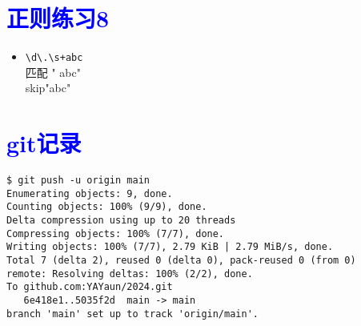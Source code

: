 \documentclass{article}
\begin{document}
\section{\textcolor{blue}{正则练习8}}
\begin{itemize}
\item \verb|\d\.\s+abc| \\ 匹配 " abc" \\skip"abc"
\end{itemize}
\section{\textcolor{blue}{git记录}}
\begin{lstlisting}
$ git push -u origin main
Enumerating objects: 9, done.
Counting objects: 100% (9/9), done.
Delta compression using up to 20 threads
Compressing objects: 100% (7/7), done.
Writing objects: 100% (7/7), 2.79 KiB | 2.79 MiB/s, done.
Total 7 (delta 2), reused 0 (delta 0), pack-reused 0 (from 0)
remote: Resolving deltas: 100% (2/2), done.
To github.com:YAYaun/2024.git
   6e418e1..5035f2d  main -> main
branch 'main' set up to track 'origin/main'.                                                                                                                    
\end{lstlisting}
\end{document}
